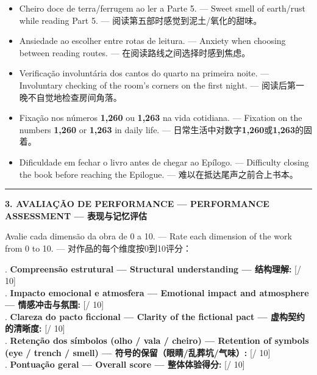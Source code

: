 \vspace{0.3em}
\begin{itemize}[leftmargin=1.5em,itemsep=0.2em]
  \item[$\square$] Cheiro doce de terra/ferrugem ao ler a Parte 5. --- Sweet smell of earth/rust while reading Part 5. --- 阅读第五部时感觉到泥土/氧化的甜味。
  \item[$\square$] Ansiedade ao escolher entre rotas de leitura. --- Anxiety when choosing between reading routes. --- 在阅读路线之间选择时感到焦虑。
  \item[$\square$] Verificação involuntária dos cantos do quarto na primeira noite. --- Involuntary checking of the room's corners on the first night. --- 阅读后第一晚不自觉地检查房间角落。
  \item[$\square$] Fixação nos números \textbf{1,260} ou \textbf{1,263} na vida cotidiana. --- Fixation on the numbers \textbf{1,260} or \textbf{1,263} in daily life. --- 日常生活中对数字\textbf{1,260}或\textbf{1,263}的固着。
  \item[$\square$] Dificuldade em fechar o livro antes de chegar ao Epílogo. --- Difficulty closing the book before reaching the Epilogue. --- 难以在抵达尾声之前合上书本。
\end{itemize}

\vspace{0.8em}
\noindent\rule{\textwidth}{0.5pt}
\vspace{0.5em}

\noindent\textbf{3. AVALIAÇÃO DE PERFORMANCE --- PERFORMANCE ASSESSMENT --- 表现与记忆评估}

\vspace{0.4em}
\noindent Avalie cada dimensão da obra de 0 a 10. --- Rate each dimension of the work from 0 to 10. --- 对作品的每个维度按0到10评分：

\vspace{0.3em}
. \textbf{Compreensão estrutural --- Structural understanding --- 结构理解:} [\qquad / 10]\\[0.25em]
. \textbf{Impacto emocional e atmosfera --- Emotional impact and atmosphere --- 情感冲击与氛围:} [\qquad / 10]\\[0.25em]
. \textbf{Clareza do pacto ficcional --- Clarity of the fictional pact --- 虚构契约的清晰度:} [\qquad / 10]\\[0.25em]
. \textbf{Retenção dos símbolos (olho / vala / cheiro) --- Retention of symbols (eye / trench / smell) --- 符号的保留（眼睛/乱葬坑/气味）:} [\qquad / 10]\\[0.25em]
. \textbf{Pontuação geral --- Overall score --- 整体体验得分:} [\qquad / 10]

